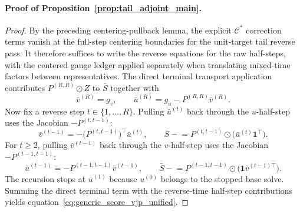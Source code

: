 \paragraph{Proof of Proposition~\ref{prop:tail_adjoint_main}.}
\begin{proof}
By the preceding centering-pullback lemma, the explicit $\mathcal C^*$ correction terms vanish at the full-step centering boundaries for the unit-target tail reverse pass. It therefore suffices to write the reverse equations for the raw half-steps, with the centered gauge ledger applied separately when translating mixed-time factors between representatives.
The direct terminal transport application contributes $P^{(R,R)}\odot Z$ to $\bar S$ together with
\[
\bar v^{(R)}=g_v,
\qquad
\bar u^{(R)}=g_u-P^{(R,R)}\bar v^{(R)}.
\]
Now fix a reverse step $t\in\{1,\dots,R\}$. Pulling $\bar u^{(t)}$ back through the $u$-half-step uses the Jacobian $-P^{(t,t-1)}$:
\[
\bar v^{(t-1)} = -\bigl(P^{(t,t-1)}\bigr)^\top \bar u^{(t)},
\qquad
\bar S \mathrel{-}= P^{(t,t-1)}\odot\bigl(\bar u^{(t)}\mathbf{1}^\top\bigr).
\]
For $t\ge 2$, pulling $\bar v^{(t-1)}$ back through the $v$-half-step uses the Jacobian $-P^{(t-1,t-1)}$:
\[
\bar u^{(t-1)} = -P^{(t-1,t-1)}\bar v^{(t-1)},
\qquad
\bar S \mathrel{-}= P^{(t-1,t-1)}\odot\bigl(\mathbf{1}\bar v^{(t-1)\top}\bigr).
\]
The recursion stops at $\bar u^{(1)}$ because $u^{(0)}$ belongs to the stopped base solve. Summing the direct terminal term with the reverse-time half-step contributions yields equation~\eqref{eq:generic_score_vjp_unified}.
\end{proof}

